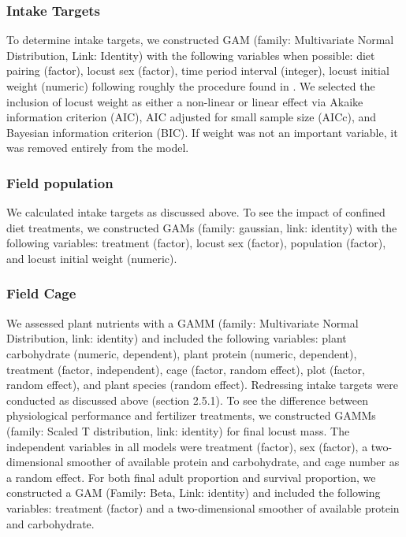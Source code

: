 \documentclass[
]{article}
\begin{document}
\subsubsection{Intake Targets}\label{intake-targets}

To determine intake targets, we constructed GAM (family: Multivariate
Normal Distribution, Link: Identity) with the following variables when
possible: diet pairing (factor), locust sex (factor), time period
interval (integer), locust initial weight (numeric) following roughly
the procedure found in \citet{lawton_mismatched_2021}. We selected the
inclusion of locust weight as either a non-linear or linear effect via
Akaike information criterion (AIC), AIC adjusted for small sample size
(AICc), and Bayesian information criterion (BIC). If weight was not an
important variable, it was removed entirely from the model.

\subsubsection{Field population}\label{field-population}

We calculated intake targets as discussed above. To see the impact of
confined diet treatments, we constructed GAMs (family: gaussian, link:
identity) with the following variables: treatment (factor), locust sex
(factor), population (factor), and locust initial weight (numeric).

\subsubsection{Field Cage}\label{field-cage}

We assessed plant nutrients with a GAMM (family: Multivariate Normal
Distribution, link: identity) and included the following variables:
plant carbohydrate (numeric, dependent), plant protein (numeric,
dependent), treatment (factor, independent), cage (factor, random
effect), plot (factor, random effect), and plant species (random
effect). Redressing intake targets were conducted as discussed above
(section 2.5.1). To see the difference between physiological performance
and fertilizer treatments, we constructed GAMMs (family: Scaled T
distribution, link: identity) for final locust mass. The independent
variables in all models were treatment (factor), sex (factor), a
two-dimensional smoother of available protein and carbohydrate, and cage
number as a random effect. For both final adult proportion and survival
proportion, we constructed a GAM (Family: Beta, Link: identity) and
included the following variables: treatment (factor) and a
two-dimensional smoother of available protein and carbohydrate.
\end{document}
